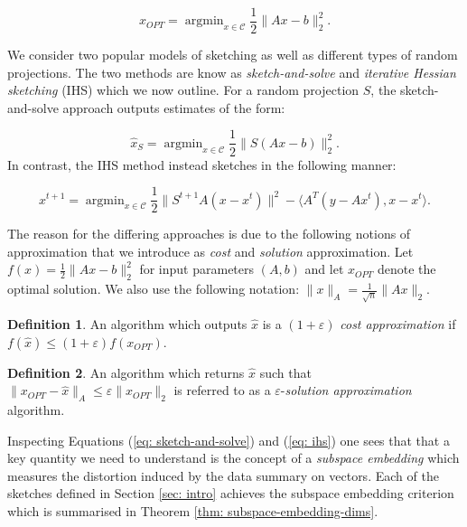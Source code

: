 \documentclass[twoside]{article}
\newcommand{\eps}{\varepsilon}
\theoremstyle{definition}\newtheorem{thm}{Theorem}[section]
\theoremstyle{definition}\newtheorem{mydef}[thm]{Definition}
\theoremstyle{definition}\newtheorem{rem}[thm]{Remark}
\theoremstyle{definition}\newtheorem{prop}[thm]{Proposition}
\theoremstyle{definition}\newtheorem{example}[thm]{Example}
\theoremstyle{definition}\newtheorem{claim}[thm]{Claim}
\theoremstyle{definition}\newtheorem{Qu}[thm]{Question}
\theoremstyle{definition}\newtheorem{Lemma}[thm]{Lemma}
\theoremstyle{definition}\newtheorem{Cor}[thm]{Corollary}
\theoremstyle{definition}\newtheorem{Fact}[]{Fact}
\DeclareMathOperator*{\argmin}{argmin}
\begin{document}
\begin{equation}
  x_{OPT} = \argmin_{x \in \mathcal{C}} \frac{1}{2} \|Ax-b\|_2^2.
\end{equation}

We consider two popular models of sketching as well as different types
of random projections.
The two methods are know as \textit{sketch-and-solve} and \textit{iterative
Hessian sketching} (IHS) which we now outline.
For a random projection $S$, the sketch-and-solve approach outputs estimates
of the form:

\begin{equation} \label{eq: sketch-and-solve}
  \hat{x}_S = \argmin_{x \in \mathcal{C}} \frac{1}{2} \|S(Ax-b)\|_2^2.
\end{equation}
\noindent In contrast, the IHS method instead sketches in the following manner:

\begin{equation} \label{eq: ihs}
  x^{t+1} = \argmin_{x \in \mathcal{C}}  \frac{1}{2} \|S^{t+1} A
  (x - x^t) \|^2 - \langle A^T (y - Ax^t), x - x^t \rangle.
\end{equation}

The reason for the differing approaches is due to the following notions of
approximation that we introduce as \textit{cost} and \textit{solution}
approximation.
Let $f(x) = \frac{1}{2}\|Ax-b\|_2^2$ for input parameters $(A,b)$ and let
$x_{OPT}$ denote the optimal solution.
We also use the following notation: $\|x\|_A = \frac{1}{\sqrt{n}}\|Ax\|_2$.

\begin{mydef} \label{def: cost-approx}
  An algorithm which outputs $\hat{x}$ is a $(1 + \eps)$ \textit{cost
   approximation} if $f(\hat{x}) \le (1+\eps) f(x_{OPT})$.
\end{mydef}

\begin{mydef} \label{def: sol-approx}
  An algorithm which returns $\hat{x}$ such that $\|x_{OPT} - \hat{x}\|_A
  \le \eps \|x_{OPT}\|_2$ is referred to as a $\eps$-\textit{solution
  approximation} algorithm.
\end{mydef}

Inspecting Equations (\ref{eq: sketch-and-solve}) and (\ref{eq: ihs}) one
sees that that a key quantity we need to understand is the concept
of a \textit{subspace embedding} which measures the distortion induced by the
data summary on vectors.
Each of the sketches defined in Section \ref{sec: intro} achieves the subspace
embedding criterion which is summarised in Theorem
\ref{thm: subspace-embedding-dims}.
\end{document}
